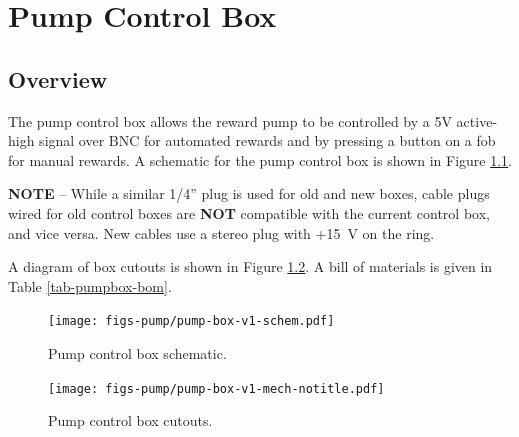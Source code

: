 
\chapter{Pump Control Box}
\label{sect-pumpbox}

\section{Overview}
\label{sect-pumpbox-over}

The pump control box allows the reward pump to be controlled by a 5V
active-high signal over BNC for automated rewards and by pressing a button 
on a fob for manual rewards. A schematic for the pump control box is
shown in Figure \ref{fig-pumpbox-schem}.

\textbf{NOTE} -- While a similar 1/4'' plug is used for old and new boxes,
cable plugs wired for old control boxes are \textbf{NOT} compatible with
the current control box, and vice versa. New cables use a stereo plug with
+15~V on the ring.

A diagram of box cutouts is shown in Figure \ref{fig-pumpbox-boxes}. A bill
of materials is given in Table \ref{tab-pumpbox-bom}.

\begin{figure}[h]
\begin{center}
\texttt{[image: figs-pump/pump-box-v1-schem.pdf]}
\end{center}
\caption{Pump control box schematic.}
\label{fig-pumpbox-schem}
\end{figure}

\begin{figure}[h]
\begin{center}
\texttt{[image: figs-pump/pump-box-v1-mech-notitle.pdf]}
\end{center}
\caption{Pump control box cutouts.}
\label{fig-pumpbox-boxes}
\end{figure}

